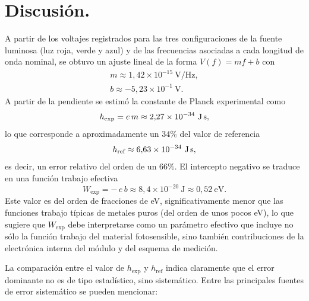 \documentclass[11pt,twocolumn]{article}
\begin{document}
\section{Discusión.}

A partir de los voltajes registrados para las tres configuraciones de la
fuente luminosa (luz roja, verde y azul) y de las frecuencias asociadas
a cada longitud de onda nominal, se obtuvo un ajuste lineal de la forma
$V(f) = mf + b$ con
\begin{align*}
    m \approx 1{,}42\times 10^{-15}~\text{V/Hz},
    \\[4pt]
    b \approx -5{,}23\times 10^{-1}~\text{V}.
\end{align*}
A partir de la pendiente se estimó la constante de Planck experimental
como
\begin{equation*}
    h_{\text{exp}} = e\,m \approx 2{,}27\times 10^{-34}~\text{J\,s},
\end{equation*}
lo que corresponde a aproximadamente un $34\%$ del valor de referencia
\begin{equation*}
    h_{\text{ref}} \approx 6{,}63\times 10^{-34}~\text{J\,s},
\end{equation*}
es decir, un error relativo del orden de un $66\%$. El intercepto
negativo se traduce en una función trabajo efectiva
\begin{equation*}
    W_{\text{exp}} = -\,e\,b \approx 8{,}4\times 10^{-20}~\text{J}
    \approx 0{,}52~\text{eV}.
\end{equation*}
Este valor es del orden de fracciones de eV, significativamente menor
que las funciones trabajo típicas de metales puros (del orden de unos
pocos eV), lo que sugiere que $W_{\text{exp}}$ debe interpretarse como
un parámetro efectivo que incluye no sólo la función trabajo del
material fotosensible, sino también contribuciones de la electrónica
interna del módulo y del esquema de medición.

La comparación entre el valor de $h_{\text{exp}}$ y $h_{\text{ref}}$
indica claramente que el error dominante no es de tipo estadístico,
sino sistemático. Entre las principales fuentes de error sistemático se
pueden mencionar:
\end{document}
